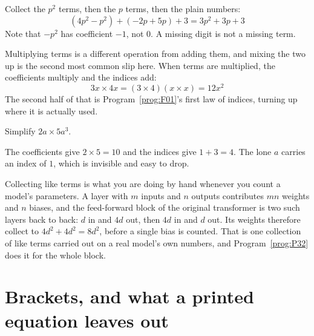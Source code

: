 \begin{fr}
\begin{ansblock}
Collect the $p^{2}$ terms, then the $p$ terms, then the plain numbers:
\[ (4p^{2} - p^{2}) + (-2p + 5p) + 3 = 3p^{2} + 3p + 3 \]
Note that $-p^{2}$ has coefficient $-1$, not $0$. A missing digit is not a
missing term.
\end{ansblock}

Multiplying terms is a different operation from adding them, and mixing the two
up is the second most common slip here. When terms are multiplied, the
coefficients multiply and the indices add:
\[ 3x \times 4x = (3 \times 4)(x \times x) = 12x^{2} \]
The second half of that is Program~\ref{prog:F01}'s first law of indices,
turning up where it is actually used.

Simplify $2a \times 5a^{3}$.
\nextframe
\end{fr}

\begin{fr}
The coefficients give $2 \times 5 = 10$ and the indices give $1 + 3 = 4$. The
lone $a$ carries an index of $1$, which is invisible and easy to drop.

\begin{aibox}
Collecting like terms is what you are doing by hand whenever you count a
model's parameters. A layer with $m$ inputs and $n$ outputs contributes $mn$
weights and $n$ biases, and the feed-forward block of the original transformer
is two such layers back to back: $d$ in and $4d$ out, then $4d$ in and $d$ out.
Its weights therefore collect to $4d^{2} + 4d^{2} = 8d^{2}$, before a single
bias is counted. That is one collection of like terms carried out on a real
model's own numbers, and Program~\ref{prog:P32} does it for the whole block.
\end{aibox}
\end{fr}

\section{Brackets, and what a printed equation leaves out}
\label{sec:F02-precedence}

